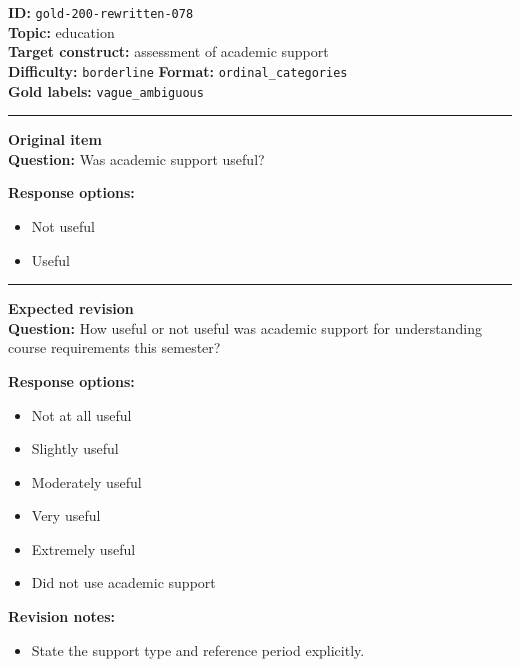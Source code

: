 \documentclass[10pt,a4paper]{article}
\newcommand{\sectionline}{\vspace{0.15em}\hrule\vspace{0.35em}}
\begin{document}
\begin{tcolorbox}[colframe=FlawRed,colback=white,colbacktitle=FlawRed!9,coltitle=black,title={Item 078\hfill Flawed item}]
\textbf{ID:} \texttt{gold-200-rewritten-078}\\
\textbf{Topic:} education\\
\textbf{Target construct:} assessment of academic support\\
\textbf{Difficulty:} \texttt{borderline} \quad \textbf{Format:} \texttt{ordinal\_categories}\\
\textbf{Gold labels:} \texttt{vague\_ambiguous}\\
\sectionline
\textbf{Original item}\\
\textbf{Question:} Was academic support useful?
\par\textbf{Response options:}
\begin{itemize}
\item Not useful
\item Useful
\end{itemize}
\sectionline
\textbf{Expected revision}\\
\textbf{Question:} How useful or not useful was academic support for understanding course requirements this semester?
\par\textbf{Response options:}
\begin{itemize}
\item Not at all useful
\item Slightly useful
\item Moderately useful
\item Very useful
\item Extremely useful
\item Did not use academic support
\end{itemize}
\par\textbf{Revision notes:}
\begin{itemize}
\item State the support type and reference period explicitly.
\end{itemize}
\end{tcolorbox}
\end{document}
